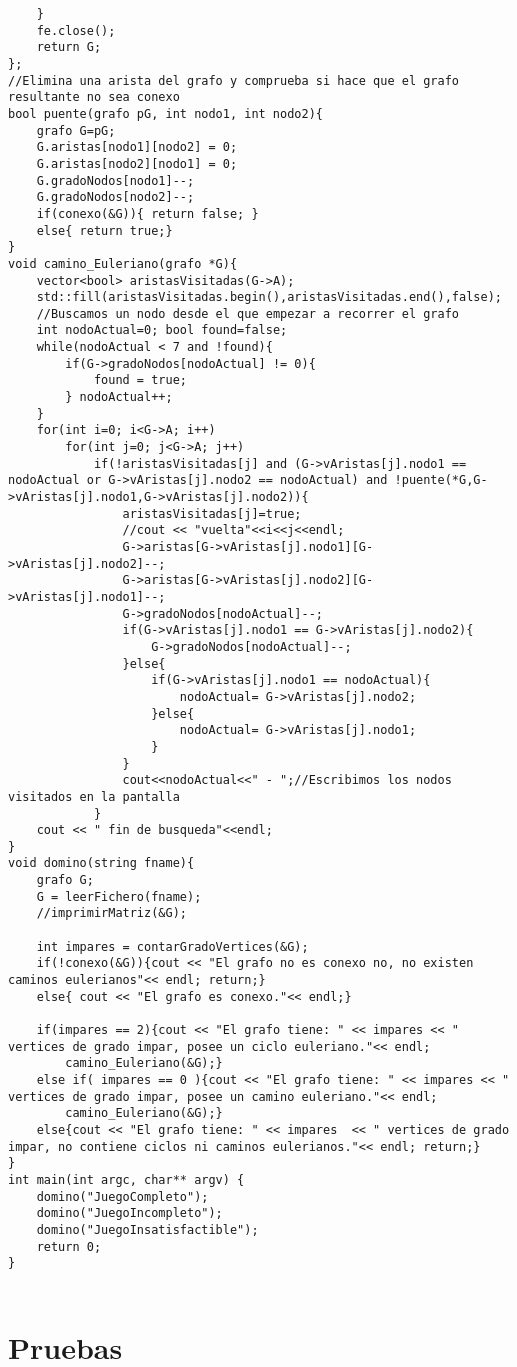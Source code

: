 \documentclass[es]{ifirak}
\begin{document}
\begin{lstlisting}
	}
	fe.close();
	return G;
};
//Elimina una arista del grafo y comprueba si hace que el grafo resultante no sea conexo
bool puente(grafo pG, int nodo1, int nodo2){
	grafo G=pG;
	G.aristas[nodo1][nodo2] = 0;
	G.aristas[nodo2][nodo1] = 0;
	G.gradoNodos[nodo1]--;
	G.gradoNodos[nodo2]--;
	if(conexo(&G)){ return false; }
	else{ return true;}
}
void camino_Euleriano(grafo *G){
	vector<bool> aristasVisitadas(G->A);
	std::fill(aristasVisitadas.begin(),aristasVisitadas.end(),false);
	//Buscamos un nodo desde el que empezar a recorrer el grafo
	int nodoActual=0; bool found=false;
	while(nodoActual < 7 and !found){
		if(G->gradoNodos[nodoActual] != 0){
			found = true;
		} nodoActual++;
	}
	for(int i=0; i<G->A; i++)
		for(int j=0; j<G->A; j++)
			if(!aristasVisitadas[j] and (G->vAristas[j].nodo1 == nodoActual or G->vAristas[j].nodo2 == nodoActual) and !puente(*G,G->vAristas[j].nodo1,G->vAristas[j].nodo2)){
				aristasVisitadas[j]=true;
				//cout << "vuelta"<<i<<j<<endl; 
				G->aristas[G->vAristas[j].nodo1][G->vAristas[j].nodo2]--;
				G->aristas[G->vAristas[j].nodo2][G->vAristas[j].nodo1]--;
				G->gradoNodos[nodoActual]--;
				if(G->vAristas[j].nodo1 == G->vAristas[j].nodo2){
					G->gradoNodos[nodoActual]--;
				}else{
					if(G->vAristas[j].nodo1 == nodoActual){
						nodoActual= G->vAristas[j].nodo2;
					}else{
						nodoActual= G->vAristas[j].nodo1;
					}
				}
				cout<<nodoActual<<" - ";//Escribimos los nodos visitados en la pantalla
			}
	cout << " fin de busqueda"<<endl;  
}
void domino(string fname){
	grafo G;
	G = leerFichero(fname);
	//imprimirMatriz(&G);
	
	int impares = contarGradoVertices(&G);
	if(!conexo(&G)){cout << "El grafo no es conexo no, no existen caminos eulerianos"<< endl; return;}
	else{ cout << "El grafo es conexo."<< endl;}
	
	if(impares == 2){cout << "El grafo tiene: " << impares << " vertices de grado impar, posee un ciclo euleriano."<< endl; 
		camino_Euleriano(&G);}
	else if( impares == 0 ){cout << "El grafo tiene: " << impares << " vertices de grado impar, posee un camino euleriano."<< endl; 
		camino_Euleriano(&G);}
	else{cout << "El grafo tiene: " << impares  << " vertices de grado impar, no contiene ciclos ni caminos eulerianos."<< endl; return;}
}
int main(int argc, char** argv) {
	domino("JuegoCompleto");
	domino("JuegoIncompleto");
	domino("JuegoInsatisfactible");
	return 0;
}


\end{lstlisting}
\pagebreak
\section{Pruebas}
\end{document}
